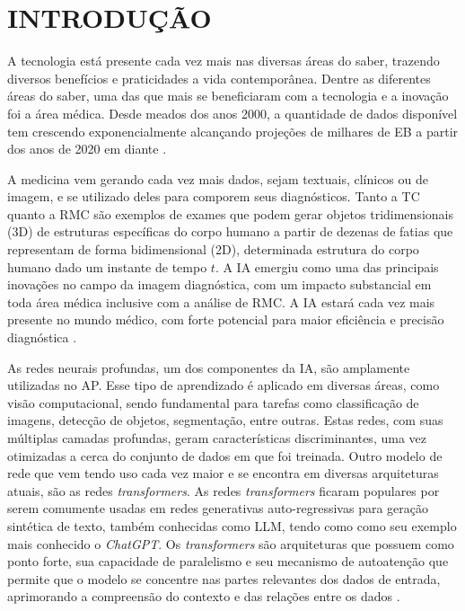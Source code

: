 \chapter{INTRODUÇÃO}
\label{chap:intro}

A tecnologia está presente cada vez mais nas diversas áreas do saber, trazendo diversos benefícios e praticidades a vida contemporânea. Dentre as diferentes áreas do saber, uma das que mais se beneficiaram com a tecnologia e a inovação foi a área médica. Desde meados dos anos 2000, a quantidade de dados disponível tem crescendo exponencialmente alcançando projeções de milhares de \gls{EB} a partir dos anos de 2020 em diante \cite{gantzDIGITALUNIVERSE2020}.

A medicina vem gerando cada vez mais dados, sejam textuais, clínicos ou de imagem, e se utilizado deles para comporem seus diagnósticos. Tanto a \gls{TC} quanto a \gls{RMC} são exemplos de exames que podem gerar objetos tridimensionais (3D) de estruturas específicas do corpo humano a partir de dezenas de fatias que representam de forma bidimensional (2D), determinada estrutura do corpo humano dado um instante de tempo $t$. A \gls{IA} emergiu como uma das principais inovações no campo da imagem diagnóstica, com um impacto substancial em toda área médica inclusive com a análise de \gls{RMC}. A \gls{IA} estará cada vez mais presente no mundo médico, com forte potencial para maior eficiência e precisão diagnóstica \cite{argentieroApplicationsArtificialIntelligence2022}.


As redes neurais profundas, um dos componentes da IA, são amplamente utilizadas no \gls{AP}. Esse tipo de aprendizado é aplicado em diversas áreas, como visão computacional, sendo fundamental para tarefas como classificação de imagens, detecção de objetos, segmentação, entre outras. Estas redes, com suas múltiplas camadas profundas, geram características discriminantes, uma vez otimizadas a cerca do conjunto de dados em que foi treinada. Outro modelo de rede que vem tendo uso cada vez maior e se encontra em diversas arquiteturas atuais, são as redes \textit{transformers}. As redes \textit{transformers} ficaram populares por serem comumente usadas em redes generativas auto-regressivas para geração sintética de texto, também conhecidas como \gls{LLM}, tendo como como seu exemplo mais conhecido o \textit{ChatGPT}. Os \textit{transformers} são arquiteturas que possuem como ponto forte, sua capacidade de paralelismo e seu mecanismo de autoatenção que permite que o modelo se concentre nas partes relevantes dos dados de entrada, aprimorando a compreensão do contexto e das relações entre os dados \cite{russell2020artificial}.

